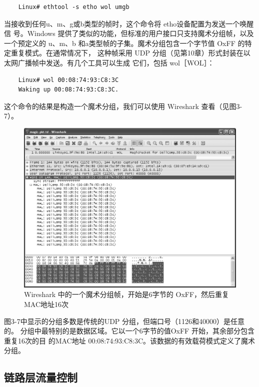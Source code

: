 \begin{verbatim}
    Linux# ethtool -s etho wol umgb
\end{verbatim}

当接收到任何u、m、g或b类型的帧时，这个命令将 etho设备配置为发送一个唤醒信
号。Windows 提供了类似的功能，但标准的用户接口只支持魔术分组帧，以及一个预定义的
u、m、b 和a类型帧的子集。魔术分组包含一个字节值 OxFF 的特定重复模式。在通常情况下，
这种帧采用 UDP 分组（见第10章）形式封装在以太网广播帧中发送。有几个工具可以生成
它们，包括 wol［WOL］：

\begin{verbatim}
    Linux# wol 00:08:74:93:C8:3C
    Waking up 00:08:74:93:C8:3C.
\end{verbatim}

这个命令的结果是构造一个魔术分组，我们可以使用 Wireshark 查看（见图3-7）。

\begin{figure}
  \centering
  \includegraphics[scale=0.5]{imgs/3/3-7.png}
  \caption{Wireshark 中的一个魔术分组帧，开始是6字节的 OxFF，然后重复 MAC地址16次}
\end{figure}

图3-7中显示的分组多数是传统的UDP 分组，但端口号（1126和40000）是任意的。
分组中最特别的是数据区域。它以一个6字节的值OxFF 开始，其余部分包含重复16次的目
的MAC地址 00:08:74:93:C8:3C。该数据的有效载荷模式定义了魔术分组。

\subsection{链路层流量控制}

